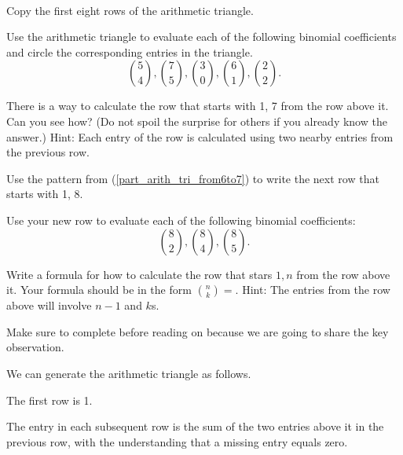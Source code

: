 \begin{act}
\label{act_arith_tri}
~
    \begin{actpart}
        \item Copy the first eight rows of the arithmetic triangle. 
        \item Use the arithmetic triangle to evaluate each of the following binomial coefficients and circle the corresponding entries in the triangle.
        $$\binom{5}{4}, \binom{7}{5}, \binom{3}{0}, \binom{6}{1}, \binom{2}{2}.$$
        
        \item \label{part_arith_tri_from6to7} There is a way to calculate the row that starts with 1, 7 from the row above it.  Can you see how?  (Do not spoil the surprise for others if you already know the answer.) Hint: Each entry of the row is calculated using two nearby entries from the previous row.  
        
        \item \label{part_arith_tri_from7to8} Use the pattern from (\ref{part_arith_tri_from6to7}) to write the next row that starts with 1, 8.
        
        \item \label{part_eval_8choosek} Use your new row to evaluate each of the following binomial coefficients:
        $$ \binom{8}{2}, \binom{8}{4}, \binom{8}{5}.$$
        
        \item Write a formula for how to calculate the row that stars $1, n$ from the row above it.  Your formula should be in the form $\displaystyle \binom{n}{k} = .$  Hint: The entries from the row above will involve $n-1$ and $k$s.
    \end{actpart}
\end{act}

Make sure to complete  before reading on because we are going to share the key observation.

\begin{rem}
\label{rem_generating_arith_triangle}
    We can generate the arithmetic triangle as follows.
        \begin{apart}
            \item The first row is 1.  
            \item The entry in each subsequent row is the sum of the two entries above it in the previous row, with the understanding that a missing entry equals zero.  
        \end{apart}
\end{rem}

